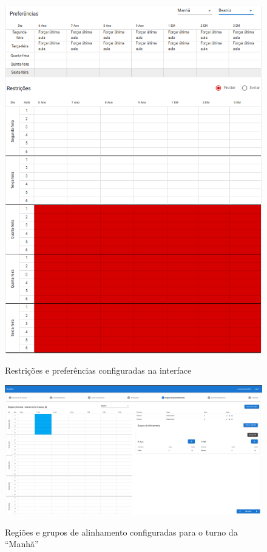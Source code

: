 \begin{figure}
	\centering
	\caption{Restrições e preferências configuradas na interface}
	\includegraphics[width=1\textwidth]{./dados/figuras/restricoes_configuradas}
	\label{fig:restricoes_configuradas}
\end{figure}

\begin{figure}
	\centering
	\caption{Regiões e grupos de alinhamento configuradas para o turno da ``Manhã''}
	\includegraphics[width=1\textwidth]{./dados/figuras/regioes_configuradas_manha}
	\label{fig:regioes_configuradas_manha}
\end{figure}


